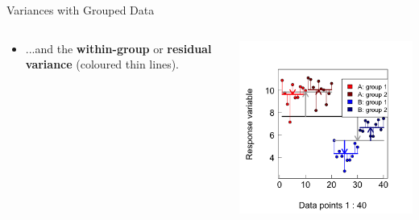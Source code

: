 \documentclass{beamer}
\begin{document}
\begin{frame}{Variances with Grouped Data}

\begin{columns}[onlytextwidth] 
    \begin{column}{0.54\textwidth}
  \begin{itemize}
    \item ...and the \textbf{within-group} or \textbf{residual variance} (coloured thin lines).
  \end{itemize}    \end{column}
    \hspace{0.02\textwidth} %
    \begin{column}{0.46\textwidth}
      \begin{center}
        \includegraphics[width=0.999\textwidth]{lectures/day_1_intro_to_mems/figures/unnamed-chunk-36-1.png}
      \end{center}
    \end{column}
  \end{columns}
  
\end{frame}
\end{document}
